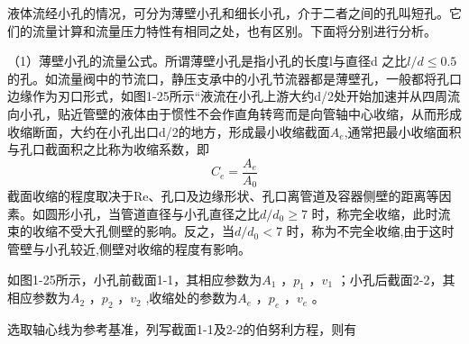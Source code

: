 液体流经小孔的情况，可分为薄壁小孔和细长小孔，介于二者之间的孔叫短孔。它们的流量计算和流量压力特性有相同之处，也有区别。下面将分别进行分析。

（1）薄壁小孔的流量公式。所谓薄壁小孔是指小孔的长度l与直径d 之比$ l/d\le 0.5 $ 的孔。如流量阀中的节流口，静压支承中的小孔节流器都是薄壁孔，一般都将孔口边缘作为刃口形式，如图1-25所示“液流在小孔上游大约d/2处开始加速并从四周流向小孔，贴近管壁的液体由于惯性不会作直角转弯而是向管轴中心收缩，从而形成收缩断面，大约在小孔出口d/2的地方，形成最小收缩截面$ A_e $,通常把最小收缩面积与孔口截面积之比称为收缩系数，即
$$ C_e=\frac{A_e}{A_0} $$
截面收缩的程度取决于Re、孔口及边缘形状、孔口离管道及容器侧壁的距离等因素。如圆形小孔，当管道直径与小孔直径之比$ d/d_0\ge 7 $ 时，称完全收缩，此时流束的收缩不受大孔侧壁的影响。反之，当$ d/d_0<7 $ 时，称为不完全收缩,由于这时管壁与小孔较近,侧壁对收缩的程度有影响。

如图1-25所示，小孔前截面1-1，其相应参数为$ A_1 $ ，$ p_1 $ ，$ v_1 $ ；小孔后截面2-2，其相应参数为$ A_2 $ ，$ p_2 $ ，$ v_2 $ ,收缩处的参数为$ A_e $ ，$ p_e $ ，$ v_e $ 。

选取轴心线为参考基准，列写截面1-1及2-2的伯努利方程，则有


